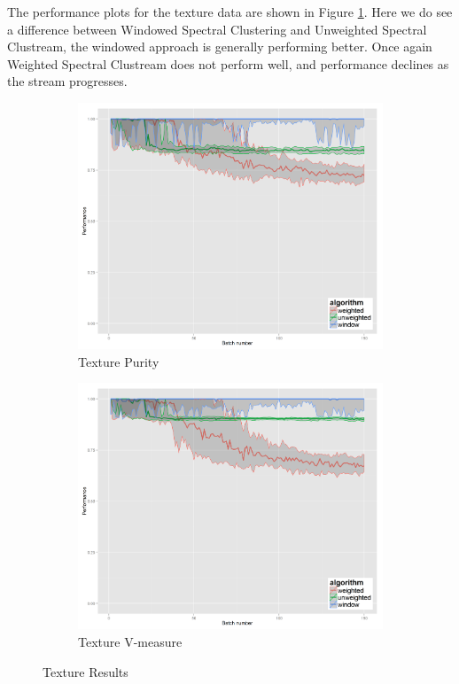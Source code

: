 The performance plots for the texture data are shown in Figure \ref{fig:texture_results}. Here we  do see a difference between Windowed Spectral Clustering and Unweighted Spectral Clustream, the windowed approach is generally performing better. Once again Weighted Spectral Clustream does not perform well, and performance declines as the stream progresses.

\begin{figure}[h!]
\begin{subfigure}{.5\textwidth}
  \centering
  \includegraphics[width=1\linewidth]{texture/texture_with_weighted_ci_one_size_purity}
  \caption{Texture Purity}
\end{subfigure}%
\begin{subfigure}{.5\textwidth}
  \centering
  \includegraphics[width=1\linewidth]{texture/texture__with_weighted_ci_one_size_vmeasure}
  \caption{Texture V-measure}
\end{subfigure}
\caption{Texture Results}
\label{fig:texture_results}
\end{figure}


